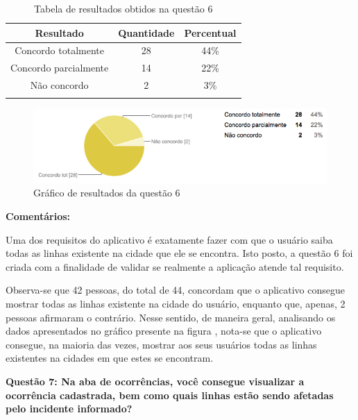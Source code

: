 \begin{center}
\begin{longtable}{c|c|c}
\hline
    \multicolumn{1}{c}{\textbf{Resultado}} & \multicolumn{1}{c}{\textbf{Quantidade}} & \multicolumn{1}{c}{\textbf{Percentual}} \\
\hline
    Concordo totalmente & 28 &  44\%\\
    \hline
    Concordo parcialmente & 14 & 22\%\\
    \hline
     Não concordo & 2 & 3\%\\
    \hline
\caption{Tabela de resultados obtidos na questão 6}
\label{tabq6}
\end{longtable}
\end{center}


\begin{figure}[h]
\begin{center}
  \includegraphics[width=16cm]{images/graficos/questao6.png}
  \caption{Gráfico de resultados da questão 6}
  \label{fig:questao6}
\end{center}
\end{figure}

\textbf{Comentários:}

Uma dos requisitos do aplicativo é exatamente fazer com que o usuário saiba todas as linhas existente na cidade que ele se encontra. Isto posto, a questão 6 foi criada com a finalidade de validar se realmente a aplicação atende tal requisito. 
	
Observa-se que 42 pessoas, do total de 44, concordam que o aplicativo consegue mostrar todas as linhas existente na cidade do usuário, enquanto que, apenas, 2 pessoas afirmaram o contrário. Nesse sentido, de maneira geral, analisando os dados apresentados no gráfico presente na figura , nota-se que o aplicativo consegue, na maioria das vezes, mostrar aos seus usuários todas as linhas existentes na cidades em que estes se encontram.\newline

\textbf{Questão 7: Na aba de ocorrências, você consegue visualizar a ocorrência cadastrada, bem como quais linhas estão sendo afetadas pelo incidente informado?}

